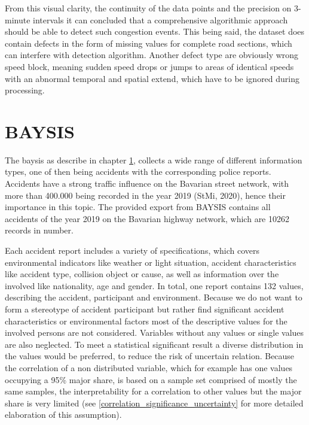 \documentclass[a4paper,headsepline,footsepline,fontsize=11pt,BCOR=12mm,DIV=12]{report}
\begin{document}
From this visual clarity, the continuity of the data points and the precision on 3-minute intervals it can concluded that a comprehensive algorithmic approach should be able to detect such congestion events. This being said, the dataset does contain defects in the form of missing values for complete road sections, which can interfere with detection algorithm. Another defect type are obviously wrong speed block, meaning sudden speed drops or jumps to areas of identical speeds with an abnormal temporal and spatial extend, which have to be ignored during processing. 

\section{BAYSIS}
\label{dataset_baysis}

The \acrfull{baysis} as describe in chapter \ref{dataset_baysis}, collects a wide range of different information types, one of then being accidents with the corresponding police reports. Accidents have a strong traffic influence on the Bavarian street network, with more than 400.000 being recorded in the year 2019 (StMi, 2020), hence their importance in this topic. The provided export from BAYSIS contains all accidents of the year 2019 on the Bavarian highway network, which are 10262 records in number. 

Each accident report includes a variety of specifications, which covers environmental indicators like weather or light situation, accident characteristics like accident type, collision object or cause, as well as information over the involved like nationality, age and gender. In total, one report contains 132 values, describing the accident, participant and environment. Because we do not want to form a stereotype of accident participant but rather find significant accident characteristics or environmental factors most of the descriptive values for the involved persons are not considered. Variables without any values or single values are also neglected. To meet a statistical significant result a diverse distribution in the values would be preferred, to reduce the risk of uncertain relation. Because the correlation of a non distributed variable, which for example has one values occupying a 95\% major share, is based on a sample set comprised of mostly the same samples, the interpretability for a correlation to other values but the major share is very limited (see \ref{correlation_significance_uncertainty} for more detailed elaboration of this assumption).
\end{document}
